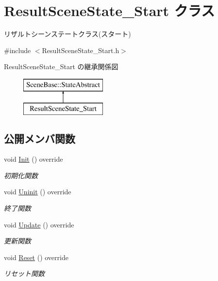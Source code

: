 \hypertarget{class_result_scene_state___start}{}\section{Result\+Scene\+State\+\_\+\+Start クラス}
\label{class_result_scene_state___start}


リザルトシーンステートクラス(スタート)  




{\ttfamily \#include $<$Result\+Scene\+State\+\_\+\+Start.\+h$>$}

Result\+Scene\+State\+\_\+\+Start の継承関係図\begin{figure}[H]
\begin{center}
\leavevmode
\includegraphics[height=2.000000cm]{class_result_scene_state___start}
\end{center}
\end{figure}
\subsection*{公開メンバ関数}
\begin{DoxyCompactItemize}
\item 
void \mbox{\hyperlink{class_result_scene_state___start_a615c7e05efd2320b8956c5fd94398f55}{Init}} () override
\begin{DoxyCompactList}\small\item\em 初期化関数 \end{DoxyCompactList}\item 
void \mbox{\hyperlink{class_result_scene_state___start_af5b9af607074e3296481a1660607fb9a}{Uninit}} () override
\begin{DoxyCompactList}\small\item\em 終了関数 \end{DoxyCompactList}\item 
void \mbox{\hyperlink{class_result_scene_state___start_a2ecdef2bef0cd1a04055e8687e11199b}{Update}} () override
\begin{DoxyCompactList}\small\item\em 更新関数 \end{DoxyCompactList}\item 
void \mbox{\hyperlink{class_result_scene_state___start_a8f776a7b2d31451c434fb74ffdd65960}{Reset}} () override
\begin{DoxyCompactList}\small\item\em リセット関数 \end{DoxyCompactList}\end{DoxyCompactItemize}
